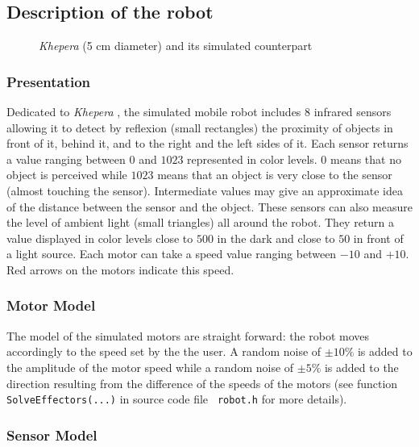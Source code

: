 \documentclass[a4paper,twoside]{article}
\begin{document}
\subsection{Description of the robot}

\begin{figure}[hpt]
\hspace{1.6cm}
\caption{{\em Khepera} (5 cm diameter) and its simulated counterpart}
\label{robots}
\end{figure}

\subsubsection{Presentation}

Dedicated to {\em Khepera} \cite{MONDADA93}, the simulated mobile robot
includes 8 infrared sensors allowing it to detect by reflexion (small
rectangles) the proximity of objects in front of it, behind it, and to the
right and the left sides of it. Each sensor returns a value ranging between
$0$ and $1023$ represented in color levels. $0$ means that no object is
perceived while $1023$ means that an object is very close to the sensor
(almost touching the sensor). Intermediate values may give an approximate idea
of the distance between the sensor and the object. These sensors can also
measure the level of ambient light (small triangles) all around the
robot. They return a value displayed in color levels close to $500$ in the
dark and close to $50$ in front of a light source. Each motor can take a speed
value ranging between $-10$ and $+10$. Red arrows on the motors indicate this
speed.

\subsubsection{Motor Model}

The model of the simulated motors are straight forward: the robot moves
accordingly to the speed set by the the user. A random noise of $\pm 10\% $ is
added to the amplitude of the motor speed while a random noise of $\pm 5\% $
is added to the direction resulting from the difference of the speeds of the
motors (see function {\tt SolveEffectors(...)} in source code file {\tt
robot.h} for more details).

\subsubsection{Sensor Model}
\end{document}
